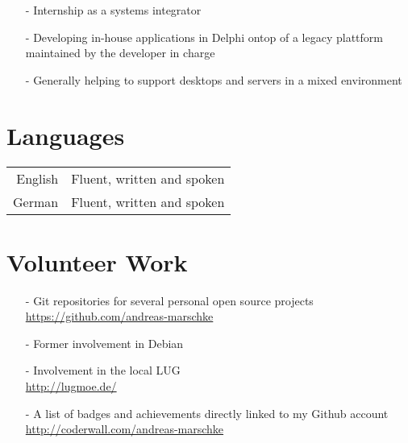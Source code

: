 \documentclass[12pt]{article}
\begin{document}
\begin{itemize}
  \item[-] Internship as a systems integrator
  \item[-] Developing in-house applications in Delphi ontop of a
    legacy plattform maintained by the developer in charge 
  \item[-] Generally helping to support desktops and servers in a
    mixed environment
\end{itemize}

\section*{Languages}

\begin{tabular}{@{} r @{ : } l @{}}
  English & Fluent, written and spoken \\
  German  & Fluent, written and spoken \\
\end{tabular}

\section*{Volunteer Work}
\begin{itemize}
  \item[-] Git repositories for several personal open source projects \\
    \url{https://github.com/andreas-marschke}
  \item[-] Former involvement in Debian
  \item[-] Involvement in the local LUG \\
    \url{http://lugmoe.de/}
  \item[-] A list of badges and achievements directly linked to my Github account \\
    \url{http://coderwall.com/andreas-marschke}

	
\end{itemize}
\end{document}
